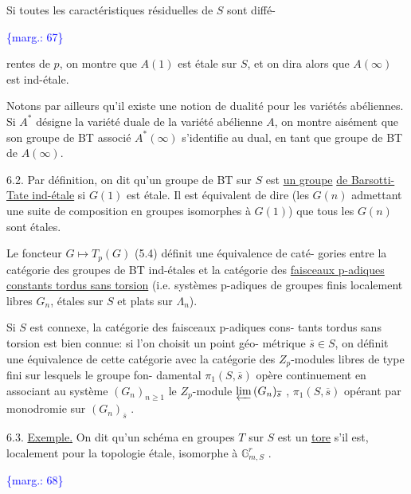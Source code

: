 \documentclass[11pt]{article}
\newcommand{\scanpage}[1]{\par\bigskip\noindent{\small\sffamily[scan #1]}\par}
\newcommand{\mspage}[1]{{\small\sffamily[p.\,#1]}}
\newcommand{\hand}[1]{\textcolor{blue}{#1}}
\newcommand{\margin}[1]{\textcolor{blue}{\{\textsf{marg.:} #1\}}}
\newcommand{\uline}[1]{\underline{#1}}
\begin{document}
Si toutes les caractéristiques résiduelles de $S$ sont diffé-%

\margin{\hand{67}}

\clearpage
\scanpage{129/68}
\mspage{\hand{III - 13}}

rentes de $p$, on montre que $A(1)$ est étale sur $S$, et on dira alors
que $A(\infty)$ est ind-étale.

Notons par ailleurs qu'il existe une notion de dualité pour
les variétés abéliennes. Si $A^*$ désigne la variété duale de la variété
abélienne $A$, on montre aisément que son groupe de BT associé $A^*(\infty)$
s'identifie au dual, en tant que groupe de BT de $A(\infty)$.

6.2. Par définition, on dit qu'un groupe de BT sur $S$ est \uline{un groupe}
\uline{de Barsotti-Tate ind-étale} si $G(1)$ est étale. Il est équivalent de dire
(les $G(n)$ admettant une suite de composition en groupes isomorphes à
$G(1)$) que tous les $G(n)$ sont étales.

Le foncteur $G \mapsto T_p(G)$ (5.4) définit une équivalence de caté-%
gories entre la catégorie des groupes de BT ind-étales et la catégorie
des \uline{faisceaux p-adiques constants tordus sans torsion} (i.e. systèmes
p-adiques de groupes finis localement libres $G_n$, étales sur $S$ et plats
sur $\Lambda_n$).

Si $S$ est connexe, la catégorie des faisceaux p-adiques cons-%
tants tordus sans torsion est bien connue: si l'on choisit un point géo-%
métrique $\overline{s} \in S$, on définit une équivalence de cette catégorie avec la
catégorie des $Z_p$-modules libres de type fini sur lesquels le groupe fon-%
damental $\pi_1(S,\overline{s})$ opère continuement en associant au système $(G_n)_{n\geq 1}$
le $Z_p$-module $\varprojlim\, (G_n)_{\overline{s}}$ , $\pi_1(S,\overline{s})$ opérant par monodromie sur $(G_n)_{\overline{s}}$ .

6.3. \uline{Exemple.} On dit qu'un schéma en groupes $T$ sur $S$ est un
\uline{tore} s'il est, localement pour la topologie étale, isomorphe à $\mathbb{G}^r_{m,S}$ .

\margin{68}

\clearpage
\scanpage{129/69}
\mspage{\hand{III-14}}
\end{document}
